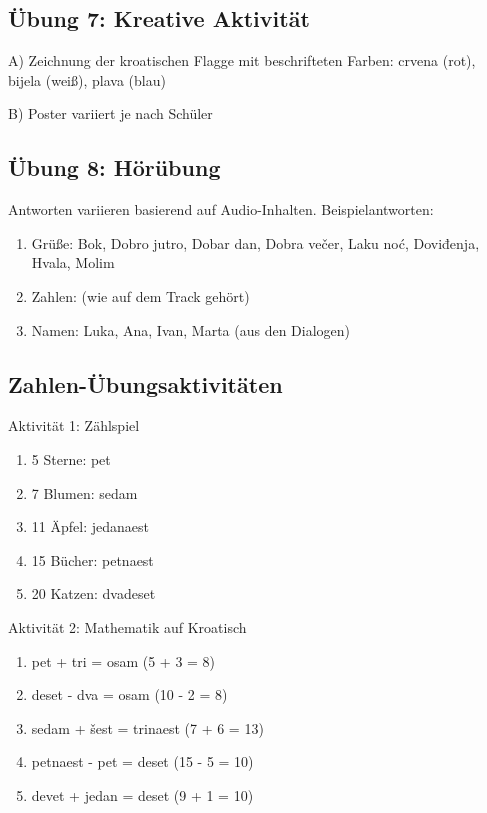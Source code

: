 \subsection*{Übung 7: Kreative Aktivität}

A) Zeichnung der kroatischen Flagge mit beschrifteten Farben: crvena (rot), bijela (weiß), plava (blau)

B) Poster variiert je nach Schüler

\subsection*{Übung 8: Hörübung}

Antworten variieren basierend auf Audio-Inhalten. Beispielantworten:
\begin{enumerate}
    \item Grüße: Bok, Dobro jutro, Dobar dan, Dobra večer, Laku noć, Doviđenja, Hvala, Molim
    \item Zahlen: (wie auf dem Track gehört)
    \item Namen: Luka, Ana, Ivan, Marta (aus den Dialogen)
\end{enumerate}

\subsection*{Zahlen-Übungsaktivitäten}

Aktivität 1: Zählspiel
\begin{enumerate}
    \item 5 Sterne: pet
    \item 7 Blumen: sedam
    \item 11 Äpfel: jedanaest
    \item 15 Bücher: petnaest
    \item 20 Katzen: dvadeset
\end{enumerate}

Aktivität 2: Mathematik auf Kroatisch
\begin{enumerate}
    \item pet + tri = osam (5 + 3 = 8)
    \item deset - dva = osam (10 - 2 = 8)
    \item sedam + šest = trinaest (7 + 6 = 13)
    \item petnaest - pet = deset (15 - 5 = 10)
    \item devet + jedan = deset (9 + 1 = 10)
\end{enumerate}

